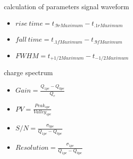 %
%
%
\begin{frame}{calculation of parameters}
signal waveform
\begin{itemize}
\item  $rise\ time=t_{.9rMaximum}-t_{.1rMaximum}$
\item $fall\ time=t_{.1fMaximum}-t_{.9fMaximum}$
\item $FWHM=t_{+1/2Maximum}-t_{-1/2Maximum}$
\end{itemize}

charge spectrum
\begin{itemize}
\item  $Gain=\frac{Q_{1pe}-Q_{0pe}}{Q_e}$
\item $PV=\frac{Peak_{spe}}{Valley_{spe}}$
\item $S/N=\frac{\sigma_{0pe}}{Q_{1pe}-Q_{0pe}}$
\item $Resolution=\frac{\sigma_{1pe}}{Q_{1pe}-Q_{0pe}}$
\end{itemize}


\end{frame}
